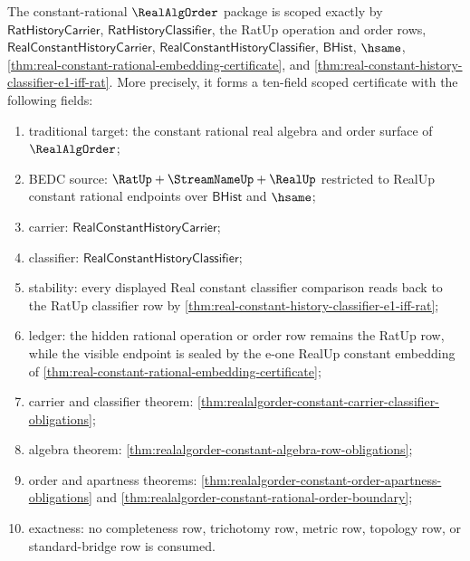 \begin{theorem}
\label{thm:realalgorder-constant-rational-scoped-certificate}
The constant-rational $\RealAlgOrder$ package is scoped exactly by
$\mathsf{RatHistoryCarrier}$, $\mathsf{RatHistoryClassifier}$, the RatUp
operation and order rows, $\mathsf{RealConstantHistoryCarrier}$,
$\mathsf{RealConstantHistoryClassifier}$, $\mathsf{BHist}$, $\hsame$,
\autoref{thm:real-constant-rational-embedding-certificate}, and
\autoref{thm:real-constant-history-classifier-e1-iff-rat}. More precisely,
it forms a ten-field scoped certificate with the following fields:
\begin{enumerate}
  \item traditional target: the constant rational real algebra and order
  surface of $\RealAlgOrder$;
  \item BEDC source: $\RatUp+\StreamNameUp+\RealUp$ restricted to RealUp
  constant rational endpoints over $\mathsf{BHist}$ and $\hsame$;
  \item carrier: $\mathsf{RealConstantHistoryCarrier}$;
  \item classifier: $\mathsf{RealConstantHistoryClassifier}$;
  \item stability: every displayed Real constant classifier comparison reads
  back to the RatUp classifier row by
  \autoref{thm:real-constant-history-classifier-e1-iff-rat};
  \item ledger: the hidden rational operation or order row remains the RatUp
  row, while the visible endpoint is sealed by the e-one RealUp constant
  embedding of \autoref{thm:real-constant-rational-embedding-certificate};
  \item carrier and classifier theorem:
  \autoref{thm:realalgorder-constant-carrier-classifier-obligations};
  \item algebra theorem:
  \autoref{thm:realalgorder-constant-algebra-row-obligations};
  \item order and apartness theorems:
  \autoref{thm:realalgorder-constant-order-apartness-obligations} and
  \autoref{thm:realalgorder-constant-rational-order-boundary};
  \item exactness: no completeness row, trichotomy row, metric row, topology
  row, or standard-bridge row is consumed.
\end{enumerate}
\end{theorem}
